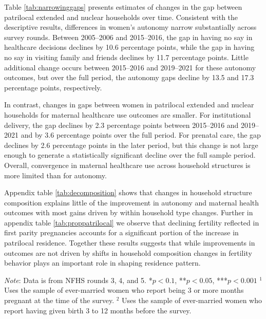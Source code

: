 \documentclass[10pt,twoside,reqno]{article}
\begin{document}
Table \ref{tab:narrowinggaps} presents estimates of changes in the gap between patrilocal extended and nuclear households over time. Consistent with the descriptive results, differences in women’s autonomy narrow substantially across survey rounds. Between 2005–2006 and 2015–2016, the gap in having no say in healthcare decisions declines by 10.6 percentage points, while the gap in having no say in visiting family and friends declines by 11.7 percentage points. Little additional change occurs between 2015–2016 and 2019–2021 for these autonomy outcomes, but over the full period, the autonomy gaps decline by 13.5 and 17.3 percentage points, respectively.

In contrast, changes in gaps between women in patrilocal extended and nuclear households for maternal healthcare use outcomes are smaller. For institutional delivery, the gap declines by 2.3 percentage points between 2015–2016 and 2019–2021 and by 3.6 percentage points over the full period. For prenatal care, the gap declines by 2.6 percentage points in the later period, but this change is not large enough to generate a statistically significant decline over the full sample period. Overall, convergence in maternal healthcare use across household structures is more limited than for autonomy. 

Appendix table \ref{tab:decomposition} shows that changes in household structure  composition explains little of the improvement in autonomy and maternal health outcomes with most gains driven by within household type changes. Further in appendix table \ref{tab:proppatrilocal} we observe that declining fertility reflected in first parity pregnancies accounts for a significant portion of the increase in patrilocal residence. Together these results suggests that while improvements in outcomes are not driven by shifts in household composition changes in fertility behavior plays an important role in shaping residence pattern.

\begin{table}[H]
\sansmath
\sffamily
\captionsetup{style=CAPTAB}
\caption{The gap between patrilocal extended and nuclear households in women's autonomy and health care use in narrowing across survey rounds}
\label{tab:narrowinggaps}
\vspace{-4pt}

\begin{scriptsize}
\setlength{\tabcolsep}{6pt}
\renewcommand{\arraystretch}{1.6}
\centering

\end{scriptsize}

\vspace{1ex}
\small\scriptsize{\textsf{\textit{Note}: Data is from NFHS rounds 3, 4, and 5.}}
\newline\small\scriptsize{\textsf{*$p<0.1$, **$p<0.05$, ***$p<0.001$}}
\newline\small\scriptsize{\textsf{$^1$ Uses the sample of ever-married women who report being 3 or more months pregnant at the time of the survey.}}
\newline\small\scriptsize{\textsf{$^2$ Uses the sample of ever-married women who report having given birth 3 to 12 months before the survey.}}

\end{table}
\end{document}
